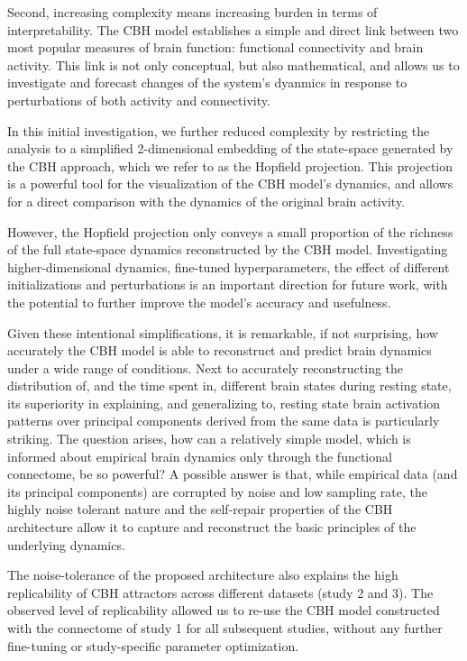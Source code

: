 \documentclass{article}
\begin{document}
Second, increasing complexity means increasing burden in terms of interpretability. The CBH model establishes a simple
and direct link between two most popular measures of brain function: functional connectivity and brain activity. This
link is not only conceptual, but also mathematical, and allows us to investigate and forecast changes of the system's
dyanmics in response to perturbations of both activity and connectivity.

In this initial investigation, we further reduced complexity by restricting the analysis to a simplified 2-dimensional
embedding of the state-space generated by the CBH approach, which we refer to as the Hopfield projection. This
projection is a powerful tool for the visualization of the CBH model's dynamics, and allows for a direct comparison
with the dynamics of the original brain activity.

However, the Hopfield projection only conveys a small proportion of the richness of the full state-space dynamics
reconstructed by the CBH model. Investigating higher-dimensional dynamics, fine-tuned hyperparameters, the effect of
different initializations and perturbations is an important direction for future work, with the potential to further
improve the model's accuracy and usefulness.

Given these intentional simplifications, it is remarkable, if not surprising, how accurately the CBH model is able to
reconstruct and predict brain dynamics under a wide range of conditions. Next to accurately reconstructing the
distribution of, and the time spent in, different brain states during resting state, its superiority in explaining, and
generalizing to, resting state brain activation patterns over principal components derived from the same data is
particularly striking. The question arises, how can a relatively simple model, which is informed about empirical brain
dynamics only through the functional connectome, be so powerful? A possible answer is that, while empirical data (and
its principal components) are corrupted by noise and low sampling rate, the highly noise tolerant nature and the
self-repair properties of the CBH architecture allow it to capture and reconstruct the basic principles of the
underlying dynamics.

The noise-tolerance of the proposed architecture also explains the high replicability of CBH attractors across different
datasets (study 2 and 3). The observed level of replicability allowed us to re-use the CBH model constructed with the
connectome of study 1 for all subsequent studies, without any further fine-tuning or study-specific parameter
optimization.
\end{document}

